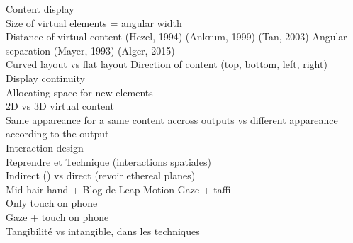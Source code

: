         Content display \\
            Size of virtual elements = angular width \cite{ShuppBallYostEtAl2006} \cite{BallNorth2008} \\
            Distance of virtual content (Hezel, 1994) (Ankrum, 1999) (Tan, 2003) \cite{ChanKaoChenEtAl2010} \cite{EnsFinneganIrani2014} 
            Angular separation (Mayer, 1993) \cite{EnsFinneganIrani2014} \cite{KishishitaKiyokawaOrloskyEtAl2014} (Alger, 2015) \\ 
            Curved layout vs flat layout \cite{ShuppBallYostEtAl2006} 
            Direction of content (top, bottom, left, right) \cite{EnsFinneganIrani2014} \\
            Display continuity \cite{TanCzerwinski2003} \cite{RashidNacentaQuigley2012} \\
            Allocating space for new elements \cite{BellFeiner2000} \\

            2D vs 3D virtual content \cite{JansenDragicevicFekete2013} \cite{SerranoHildebrandtSubramanianEtAl2014} \\
            Same appareance for a same content accross outputs vs different appareance according to the output \cite{GrubertHeinischQuigleyEtAl2015} \\

    Interaction design\\
    	Reprendre \cite{Bernatchez2008} et \cite{JankowskiHachet2013}
    	Technique (interactions spatiales) \\
        	Indirect (\cite{TeatherStuerzlinger2011}) vs direct (revoir ethereal planes) \\
            Mid-hair hand \cite{EnsFinneganIrani2014} \cite{ChanKaoChenEtAl2010} \cite{JonesSodhiForsythEtAl2012} + Blog de Leap Motion
            Gaze + taffi \\
            Only touch on phone \\
            Gaze + touch on phone \\

        Tangibilité vs intangible, dans les techniques \\


